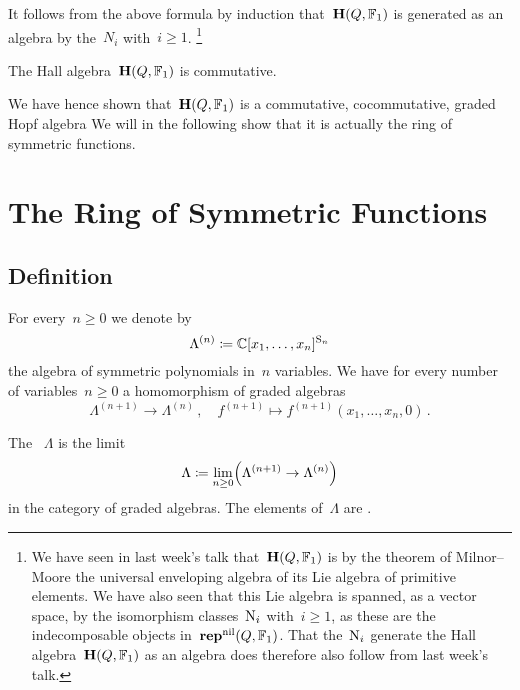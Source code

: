 \documentclass[a4paper,11pt]{scrartcl}
\begin{document}
\begin{example}
\begin{enumerate}
      It follows from the above formula by induction that~$\mathbf{H}(Q, \mathbb{F}_1)$ is generated as an algebra by the~$N_i$ with~$i \geq 1$.%
      \footnote{%
        We have seen in last week’s talk that~$\mathbf{H}(Q, \mathbb{F}_1)$ is by the theorem of Milnor--Moore the universal enveloping algebra of its Lie algebra of primitive elements.
        We have also seen that this Lie algebra is spanned, as a vector space, by the isomorphism classes~$\mathrm{N}_i$ with~$i \geq 1$, as these are the indecomposable objects in~$\mathbf{rep}^{\mathrm{nil}}(Q, \mathbb{F}_1)$.
        That the~$\mathrm{N}_i$ generate the Hall algebra~$\mathbf{H}(Q, \mathbb{F}_1)$ as an algebra does therefore also follow from last week’s talk.
      }
  \end{enumerate}
\end{example}

\begin{corollary}
  The Hall algebra~$\mathbf{H}(Q, \mathbb{F}_1)$ is commutative.
\end{corollary}

We have hence shown that~$\mathbf{H}(Q, \mathbb{F}_1)$ is a commutative, cocommutative, graded Hopf algebra
We will in the following show that it is actually the ring of symmetric functions.





\section{The Ring of Symmetric Functions}



\subsection{Definition}

For every~$n \geq 0$ we denote by
\[
  \Lambda^{(n)}
  \coloneqq
  \mathbb{C}[x_1, \dotsc, x_n]^{\mathrm{S}_n}
\]
the algebra of symmetric polynomials in~$n$ variables.
We have for every number of variables~$n \geq 0$ a homomorphism of graded algebras
\[
  \Lambda^{(n+1)} \to \Lambda^{(n)} \,,
  \quad
  f^{(n+1)}
  \mapsto
  f^{(n+1)}(x_1, \dotsc, x_n, 0) \,.
\]

\begin{definition}
  The ~$\Lambda$ is the limit
  \[
    \Lambda
    \coloneqq
    \lim_{n \geq 0}
    \Bigl( \Lambda^{(n+1)} \to \Lambda^{(n)} \Bigr)
  \]
  in the category of graded algebras.
  The elements of~$\Lambda$ are .
\end{definition}
\end{document}

